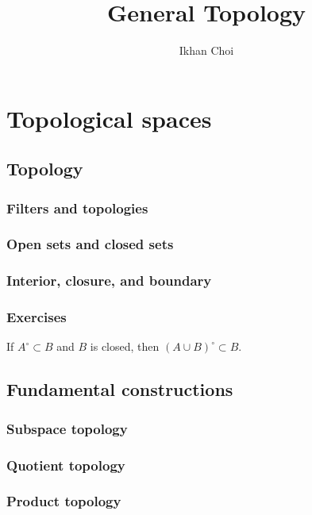 \documentclass{../note}
\begin{document}
\title{General Topology}
\author{Ikhan Choi}
\maketitle
\tableofcontents

\part{Topological spaces}


\chapter{Topology}

\section{Filters and topologies}
\section{Open sets and closed sets}
\section{Interior, closure, and boundary}


\section*{Exercises}

\begin{prb}
If $A^\circ\subset B$ and $B$ is closed, then $(A\cup B)^\circ\subset B$.
\end{prb}




\chapter{Fundamental constructions}
\section{Subspace topology}
\section{Quotient topology}
\section{Product topology}
\section{}
\end{document}
